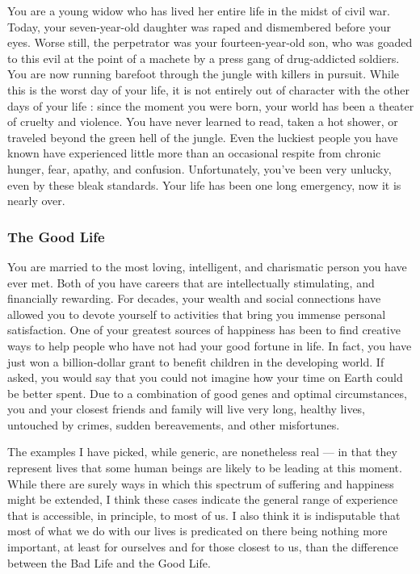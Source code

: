 \documentclass[a4paper,14pt]{extarticle}
\begin{document}
You are a young widow who has lived her entire life in the midst of civil war.
Today, your seven-year-old daughter was raped and dismembered before your eyes.
Worse still, the perpetrator was your fourteen-year-old son, who was goaded to this evil at the point of a machete by a press gang of drug-addicted soldiers.
You are now running barefoot through the jungle with killers in pursuit.
While this is the worst day of your life, it is not entirely out of character with the other days of your life :
since the moment you were born, your world has been a theater of cruelty and violence.
You have never learned to read, taken a hot shower, or traveled beyond the green hell of the jungle.
Even the luckiest people you have known have experienced little more than an occasional respite from chronic hunger, fear, apathy, and confusion.
Unfortunately, you've been very unlucky, even by these bleak standards.
Your life has been one long emergency, now it is nearly over.

\subsubsection{The Good Life}

You are married to the most loving, intelligent, and charismatic person you have ever met.
Both of you have careers that are intellectually stimulating, and financially rewarding.
For decades, your wealth and social connections have allowed you to devote yourself to activities that bring you immense personal satisfaction.
One of your greatest sources of happiness has been to find creative ways to help people who have not had your good fortune in life.
In fact, you have just won a billion-dollar grant to benefit children in the developing world.
If asked, you would say that you could not imagine how your time on Earth could be better spent.
Due to a combination of good genes and optimal circumstances, you and your closest friends and family will live very long, healthy lives, untouched by crimes, sudden bereavements, and other misfortunes.

The examples I have picked, while generic, are nonetheless real --- in that they represent lives that some human beings are likely to be leading at this moment.
While there are surely ways in which this spectrum of suffering and happiness might be extended, I think these cases indicate the general range of experience that is accessible, in principle, to most of us.
I also think it is indisputable that most of what we do with our lives is predicated on there being nothing more important, at least for ourselves and for those closest to us, than the difference between the Bad Life and the Good Life.
\end{document}
